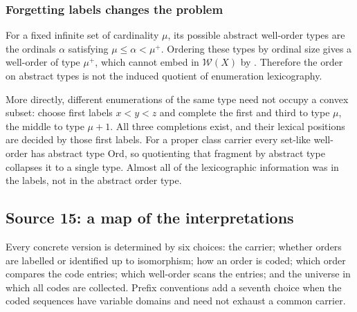 \documentclass[11pt]{article}
\theoremstyle{definition}
\theoremstyle{remark}
\newcommand{\Ord}{\mathrm{Ord}}
\newcommand{\W}{\mathcal W}
\begin{document}
\subsubsection{Forgetting labels changes the problem}
For a fixed infinite set of cardinality $\mu$, its possible abstract
well-order types are the ordinals $\alpha$ satisfying
$\mu\leq\alpha<\mu^+$. Ordering these types by ordinal size gives a
well-order of type $\mu^+$, which cannot embed in $\W(X)$ by
. Therefore the order on abstract types is
not the induced quotient of enumeration lexicography.

More directly, different enumerations of the same type need not occupy
a convex subset: choose first labels $x<y<z$ and complete the first and
third to type $\mu$, the middle to type $\mu+1$. All three completions
exist, and their lexical positions are decided by those first labels.
For a proper class carrier every set-like well-order has abstract type
$\Ord$, so quotienting that fragment by abstract type collapses it to a
single type. Almost all of the lexicographic information was in the
labels, not in the abstract order type.

\subsection{Source 15: a map of the interpretations}\label{swo:cb:sec:map}

Every concrete version is determined by six choices: the carrier; whether
orders are labelled or identified up to isomorphism; how an order is coded;
which order compares the code entries; which well-order scans the entries;
and the universe in which all codes are collected. Prefix conventions add
a seventh choice when the coded sequences have variable domains and need
not exhaust a common carrier.
\end{document}

